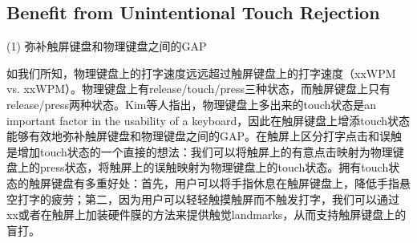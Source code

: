
\subsection{Benefit from Unintentional Touch Rejection}

(1) 弥补触屏键盘和物理键盘之间的GAP

如我们所知，物理键盘上的打字速度远远超过触屏键盘上的打字速度（xxWPM vs. xxWPM）。物理键盘上有release/touch/press三种状态，而触屏键盘上只有release/press两种状态。Kim等人\cite{2013-TapBoard}指出，物理键盘上多出来的touch状态是an important factor in the usability of a keyboard，因此在触屏键盘上增添touch状态能够有效地弥补触屏键盘和物理键盘之间的GAP。在触屏上区分打字点击和误触是增加touch状态的一个直接的想法：我们可以将触屏上的有意点击映射为物理键盘上的press状态，将触屏上的误触映射为物理键盘上的touch状态\cite{2013-TapBoard,2016-TapBoard2}。拥有touch状态的触屏键盘有多重好处：首先，用户可以将手指休息在触屏键盘上，降低手指悬空打字的疲劳\cite{2013-TouchDisplay}；第二，因为用户可以轻轻触摸触屏而不触发打字，我们可以通过xx\cite{2011-Stimtac,2010-TeslaTouch,2011-Enhancing}或者在触屏上加装硬件膜\cite{2008-Slap,2020-TouchFire}的方法来提供触觉landmarks，从而支持触屏键盘上的盲打。


